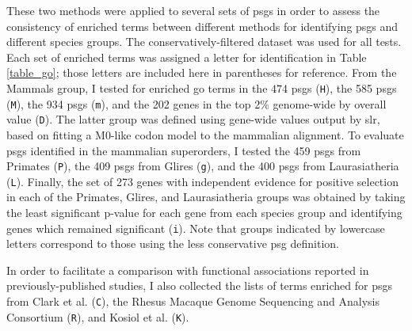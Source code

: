 These two methods were applied to several sets of \acp{psg} in order
to assess the consistency of enriched terms between different methods
for identifying \acp{psg} and different species groups. The
conservatively-filtered dataset was used for all tests. Each set of
enriched terms was assigned a letter for identification in Table
\ref{table_go}; those letters are included here in parentheses for
reference. From the Mammals group, I tested for enriched \ac{go} terms
in the 474 \psghoch \acp{psg} (\texttt{H}), the 585 \psgeone \acp{psg}
(\texttt{M}), the 934 \psgefive \acp{psg} (\texttt{m}), and the 202
genes in the top 2\% genome-wide by overall \dnds value
(\texttt{D}). The latter group was defined using gene-wide \dnds
values output by \ac{slr}, based on fitting a M0-like codon model to
the mammalian alignment. To evaluate \acp{psg} identified in the
mammalian superorders, I tested the 459 \psgeone \acp{psg} from
Primates (\texttt{P}), the 409 \psgefive \acp{psg} from Glires
(\texttt{g}), and the 400 \psgeone \acp{psg} from Laurasiatheria
(\texttt{L}). Finally, the set of 273 genes with independent evidence
for positive selection in each of the Primates, Glires, and
Laurasiatheria groups was obtained by taking the least significant
\psgefive p-value for each gene from each species group and
identifying genes which remained significant (\texttt{i}). Note that
groups indicated by lowercase letters correspond to those using the
less conservative \psgefive \ac{psg} definition.

In order to facilitate a comparison with functional associations
reported in previously-published studies, I also collected the lists
of terms enriched for \acp{psg} from Clark et
al. \citeyearpar{Clark2003} (\texttt{C}), the Rhesus Macaque Genome
Sequencing and Analysis Consortium \citeyearpar{Macaque2007}
(\texttt{R}), and Kosiol et al. \citeyearpar{Kosiol2008} (\texttt{K}).

